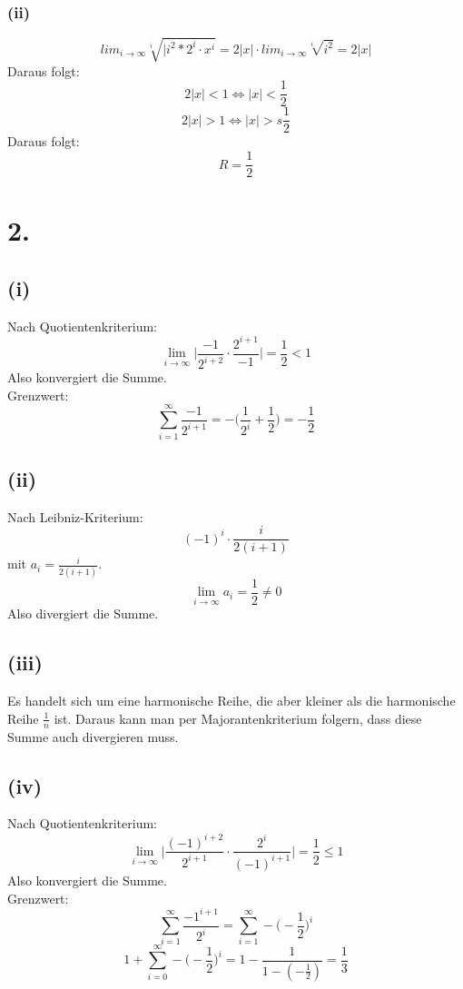 \documentclass[a4paper]{scrartcl}
\begin{document}
\subsubsection{(ii)}
\[lim_{i\to\infty} \sqrt[i]{|i^2 * 2^i \cdot x^i} = 2|x| \cdot lim_{i\to\infty} \sqrt[i]{i^2} = 2|x|\]
Daraus folgt: 
\[2|x| < 1 \Leftrightarrow |x| < \frac{1}{2}\]
\[2|x| > 1 \Leftrightarrow |x| >s \frac{1}{2}\]
Daraus folgt: \\
\[R = \frac{1}{2}\]
\section{2.}
\subsection{(i)}
Nach Quotientenkriterium:
\[ \lim_{i\to\infty} \bigg|\frac {-1} {2^{i+2}} \cdot \frac {2^{i+1}} {-1}\bigg| = \frac 1 2 < 1 \]
Also konvergiert die Summe. \\
Grenzwert: 
\[ \sum_{i=1}^\infty \frac {-1} {2^{i+1}} = - \Big(\frac 1 {2^i} + \frac 1 2 \Big) = - \frac 1 2 \]

\subsection{(ii)}
Nach Leibniz-Kriterium:
\[ (-1)^i \cdot \frac i {2(i+1)} \]
mit \(a_i = \frac i {2(i+1)} \).
\[ \lim_{i\to\infty} a_i = \frac 1 2 \neq 0 \]
Also divergiert die Summe.

\subsection{(iii)}
Es handelt sich um eine harmonische Reihe, die aber kleiner als die harmonische Reihe \( \frac 1 n \) ist. Daraus kann man per Majorantenkriterium folgern, dass diese Summe auch divergieren muss.

\subsection{(iv)}
Nach Quotientenkriterium:
\[ \lim_{i\to\infty} \bigg| \frac {(-1)^{i+2}} {2^{i+1}} \cdot \frac {2^i} {(-1)^{i+1}} \bigg| = \frac 1 2 \le 1 \]
Also konvergiert die Summe. \\
Grenzwert:
\[ \sum_{i=1}^\infty \frac {{-1}^{i+1}} {2^i} = \sum_{i=1}^\infty -\Big(-\frac 1 2\Big)^i \]
\[ 1+\sum_{i=0}^\infty -\Big(-\frac 1 2\Big)^i = 1 -\frac 1 {1-(-\frac 1 2)} = \frac 1 3 \]
\end{document}
